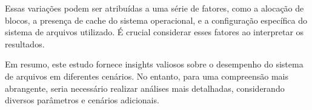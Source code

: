 \documentclass[
	12pt,				%
	openright,			%
	oneside,			%
	a4paper,			%
	chapter=TITLE,		%
	english,			%
	french,				%
	spanish,			%
	brazil				%
	]{abntex2}
\theoremstyle{definition}
\begin{document}
Essas variações podem ser atribuídas a uma série de fatores, como a 
alocação de blocos, a presença de cache do sistema operacional, e a 
configuração específica do sistema de arquivos utilizado. É crucial 
considerar esses fatores ao interpretar os resultados.

Em resumo, este estudo fornece insights valiosos sobre o desempenho do 
sistema de arquivos em diferentes cenários. No entanto, para uma compreensão 
mais abrangente, seria necessário realizar análises mais detalhadas, 
considerando diversos parâmetros e cenários adicionais.
\postextual



\cite{FAIRBANKS2012S118}
\cite{bovet_cesati_2005}
\cite{Tso}
\cite{matur}
\cite{kumar}
\end{document}
